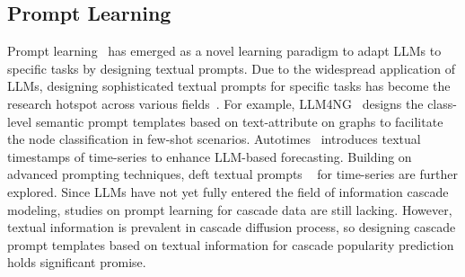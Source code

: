 \subsection{Prompt Learning}
    Prompt learning~\cite{liu2023pre} has emerged as a novel learning paradigm to adapt LLMs to specific tasks by designing textual prompts.
    Due to the widespread application of LLMs, designing sophisticated textual prompts for specific tasks has become the research hotspot across various fields~\cite{gong2024self}.
    For example, 
    LLM4NG~\cite{yu2023empower} designs the class-level semantic prompt templates based on text-attribute on graphs to facilitate the node classification in few-shot scenarios.
    Autotimes~\cite{liu2024autotimes}  introduces textual timestamps of time-series to enhance LLM-based forecasting.
    Building on advanced prompting techniques, deft textual prompts ~\cite{jin2023time,liu2024unitime} for time-series are further explored.
    Since LLMs have not yet fully entered the field of information cascade modeling, studies on prompt learning for cascade data are still lacking. 
    However, textual information is prevalent in cascade diffusion process, so designing cascade prompt templates based on textual information for cascade popularity prediction holds significant promise.